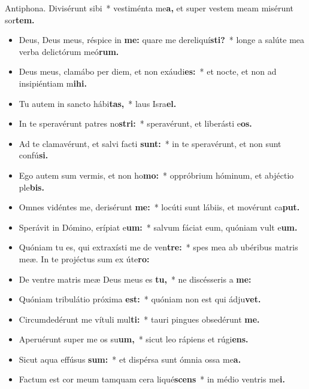 \noindent \hspace*{-5mm} Antiphona. Divisérunt sibi~* vestiménta me\textbf{a,} et super vestem meam misérunt sor\textbf{tem.}

{\par}

\begin{multicols}{2}
\begin{itemize}[%
label=\null, %
leftmargin=0pt, %
itemindent=3mm, %
labelsep=0pt, %
labelwidth=0pt, %
rightmargin=0pt, %
parsep=0pt, %
topsep=0pt, %
itemsep=0pt]%
\item Deus, Deus meus, réspice in \textbf{me:} quare me dereliquí\textbf{sti?}~* longe a salúte mea verba deli\-ctórum meó\textbf{rum.}
\item Deus meus, clamábo per diem, et non exáudi\textbf{es:}~* et nocte, et non ad insipiéntiam m\textbf{ihi.}
\item Tu autem in sancto hábi\textbf{tas,}~* laus Isra\textbf{el.}
\item In te speravérunt patres no\textbf{stri:}~* speravérunt, et liberásti e\textbf{os.}
\item Ad te clamavérunt, et salvi facti \textbf{sunt:}~* in te speravérunt, et non sunt confú\textbf{si.}
\item Ego autem sum vermis, et non ho\textbf{mo:}~* oppróbrium hóminum, et abjéctio ple\textbf{bis.}
\item Omnes vidéntes me, derisérunt \textbf{me:}~* locúti sunt lábiis, et movérunt ca\textbf{put.}
\item Sperávit in Dómino, erípiat e\textbf{um:}~* salvum fáciat eum, quóniam vult e\textbf{um.}
\item Quóniam tu es, qui extraxísti me de ven\textbf{tre:}~* spes mea ab ubéribus matris meæ. In te projé\-ctus sum ex úte\textbf{ro:}
\item De ventre matris meæ Deus meus es \textbf{tu,}~* ne discésseris a \textbf{me:}
\item Quóniam tribulátio próxima \textbf{est:}~* quóniam non est qui ádju\textbf{vet.}
\item Circumdedérunt me vítuli mul\textbf{ti:}~* tauri pingues obsedérunt \textbf{me.}
\item Aperuérunt super me os su\textbf{um,}~* sicut leo rápiens et rúgi\textbf{ens.}
\item Sicut aqua effúsus \textbf{sum:}~* et dispérsa sunt ómnia ossa me\textbf{a.}
\item Factum est cor meum tamquam cera liqué\textbf{scens}~* in médio ventris me\textbf{i.}

\end{itemize}
\end{multicols}
